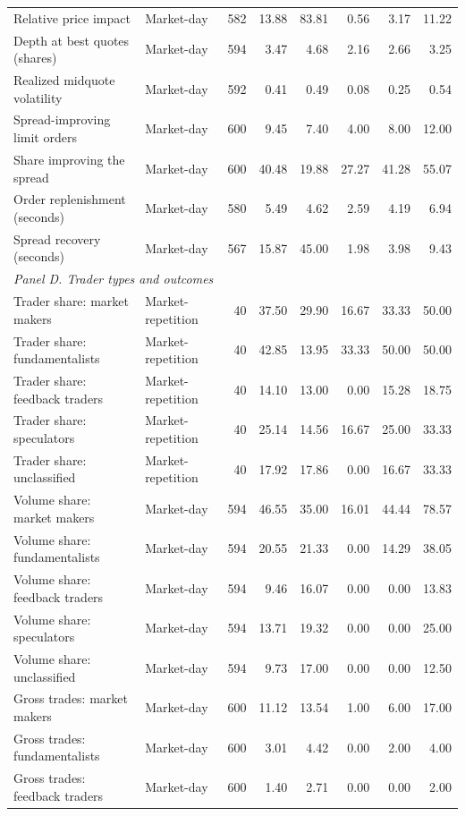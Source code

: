 \begin{tabular}{llrrrrrr}
Relative price impact & Market-day & 582 & 13.88 & 83.81 & 0.56 & 3.17 & 11.22 \\
Depth at best quotes (shares) & Market-day & 594 & 3.47 & 4.68 & 2.16 & 2.66 & 3.25 \\
Realized midquote volatility & Market-day & 592 & 0.41 & 0.49 & 0.08 & 0.25 & 0.54 \\
Spread-improving limit orders & Market-day & 600 & 9.45 & 7.40 & 4.00 & 8.00 & 12.00 \\
Share improving the spread & Market-day & 600 & 40.48 & 19.88 & 27.27 & 41.28 & 55.07 \\
Order replenishment (seconds) & Market-day & 580 & 5.49 & 4.62 & 2.59 & 4.19 & 6.94 \\
Spread recovery (seconds) & Market-day & 567 & 15.87 & 45.00 & 1.98 & 3.98 & 9.43 \\
\multicolumn{8}{l}{\textit{Panel D. Trader types and outcomes}} \\
Trader share: market makers & Market-repetition & 40 & 37.50 & 29.90 & 16.67 & 33.33 & 50.00 \\
Trader share: fundamentalists & Market-repetition & 40 & 42.85 & 13.95 & 33.33 & 50.00 & 50.00 \\
Trader share: feedback traders & Market-repetition & 40 & 14.10 & 13.00 & 0.00 & 15.28 & 18.75 \\
Trader share: speculators & Market-repetition & 40 & 25.14 & 14.56 & 16.67 & 25.00 & 33.33 \\
Trader share: unclassified & Market-repetition & 40 & 17.92 & 17.86 & 0.00 & 16.67 & 33.33 \\
Volume share: market makers & Market-day & 594 & 46.55 & 35.00 & 16.01 & 44.44 & 78.57 \\
Volume share: fundamentalists & Market-day & 594 & 20.55 & 21.33 & 0.00 & 14.29 & 38.05 \\
Volume share: feedback traders & Market-day & 594 & 9.46 & 16.07 & 0.00 & 0.00 & 13.83 \\
Volume share: speculators & Market-day & 594 & 13.71 & 19.32 & 0.00 & 0.00 & 25.00 \\
Volume share: unclassified & Market-day & 594 & 9.73 & 17.00 & 0.00 & 0.00 & 12.50 \\
Gross trades: market makers & Market-day & 600 & 11.12 & 13.54 & 1.00 & 6.00 & 17.00 \\
Gross trades: fundamentalists & Market-day & 600 & 3.01 & 4.42 & 0.00 & 2.00 & 4.00 \\
Gross trades: feedback traders & Market-day & 600 & 1.40 & 2.71 & 0.00 & 0.00 & 2.00 \\

\end{tabular}
